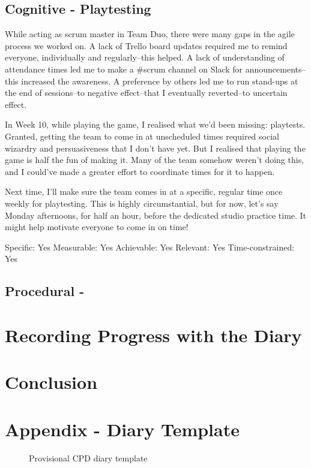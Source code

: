 \documentclass{scrartcl}
\begin{document}
\subsection{Cognitive - Playtesting} %
While acting as scrum master in Team Duo, there were many gaps in the agile process we worked on. A lack of Trello board updates required me to remind everyone, individually and regularly--this helped. A lack of understanding of attendance times led me to make a #scrum channel on Slack for announcements--this increased the awareness. A preference by others led me to run stand-ups at the end of sessions--to negative effect--that I eventually reverted--to uncertain effect.

In Week 10, while playing the game, I realised what we'd been missing: playtests. Granted, getting the team to come in at unscheduled times required social wizardry and persuasiveness that I don't have yet. But I realised that playing the game is half the fun of making it. Many of the team somehow weren't doing this, and I could've made a greater effort to coordinate times for it to happen.

Next time, I'll make sure the team comes in at a specific, regular time once weekly for playtesting. This is highly circumstantial, but for now, let's say Monday afternoons, for half an hour, before the dedicated studio practice time. It might help motivate everyone to come in on time!

Specific: Yes
Measurable: Yes
Achievable: Yes
Relevant: Yes
Time-constrained: Yes

\subsection{Procedural - } %


\section{Recording Progress with the Diary} %


\section{Conclusion} %





\newpage
\section{Appendix - Diary Template}
\begin{figure}[h]
\centering
\caption{Provisional CPD diary template}
\end{figure}
\end{document}
